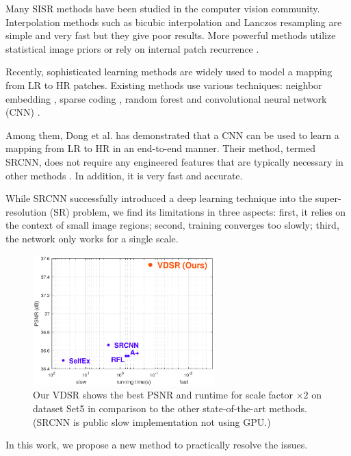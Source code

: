 \documentclass[10pt,twocolumn,letterpaper]{article}
\begin{document}
Many SISR methods have been studied in the computer vision community. Interpolation methods such as bicubic interpolation and Lanczos resampling \cite{duchon1979lanczos} are simple and very fast but they give poor results. More powerful methods utilize statistical image priors \cite{sun2008image,Kim2010} or rely on internal patch recurrence \cite{glasner2009super}.

Recently, sophisticated learning methods are widely used to model a mapping from LR to HR patches. Existing methods use various techniques: neighbor embedding \cite{chang2004super,bevilacqua2012}, sparse coding \cite{yang2010image,zeyde2012single,Timofte2013,Timofte}, random forest \cite{schulter2015fast} and convolutional neural network (CNN) \cite{dong2015image}.

Among them, Dong et al. \cite{dong2015image} has demonstrated that a CNN can be used to learn a mapping from LR to HR in an end-to-end manner. Their method, termed SRCNN, does not require any engineered features that are typically necessary in other methods \cite{yang2010image,zeyde2012single,Timofte2013,Timofte}. In addition, it is very fast and accurate.

While SRCNN successfully introduced a deep learning technique into the super-resolution (SR) problem, we find its limitations in three aspects: first, it relies on the context of small image regions; second, training converges too slowly; third, the network only works for a single scale.

\begin{figure}
\centering
{\graphicspath{{figs/figf/}}\includegraphics[width=7cm]{frontfig}}
\caption{Our VDSR shows the best PSNR and runtime for scale factor $\times2$ on dataset Set5 in comparison to the other state-of-the-art methods. (SRCNN is public slow implementation not using GPU.)}
\end{figure}



In this work, we propose a new method to practically resolve the issues.
\end{document}
